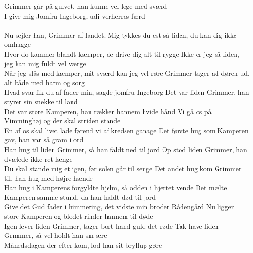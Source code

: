 \clearpage
{}

 Grimmer går på gulvet, han kunne vel lege med sværd\\
I give mig Jomfru Ingeborg, udi vorherres færd\\
\hops
{} {}\\
 Nu sejler han, Grimmer af landet.
\hops
{}Mig tykkes du est så liden, du kan dig ikke omhugge\\
Hvor do kommer blandt kæmper, de drive dig alt til rygge
\hops
{}Ikke er jeg så liden, jeg kan mig fuldt vel værge\\
Når jeg slås med kæmper, mit sværd kan jeg vel røre 
\hops
{}Grimmer tager ad døren ud, alt både med harm og sorg\\
Hvad svar fik du af fader min, sagde jomfru Ingeborg
\hops
{}Det var liden Grimmer, han styrer sin snekke til land\\
Det var store Kamperen, han rækker hannem hvide hånd
\hops
{}Vi gå os på Vimminghøj og der skal striden stande\\
En af os skal livet lade førend vi af kredsen ganage
\hops
{}Det første hug som Kamperen gav, han var så gram i ord\\
Han hug til liden Grimmer, så han faldt ned til jord
\hops
{}Op stod liden Grimmer, han dvælede ikke ret længe\\
Du skal stande mig et igen, før solen går til senge
\hops
{}Det andet hug kom Grimmer til, han hug med højre hænde\\
Han hug i Kamperens forgyldte hjelm, så odden i hjertet vende
\hops
{}Det mælte Kamperen samme stund, da han haldt død til jord\\
Give det Gud fader i himmering, det vidste min broder Rådengård
\hops
{}Nu ligger store Kamperen og blodet rinder hannem til døde\\
Igen lever liden Grimmer, tager bort hand guld det røde
\hops
{}Tak have liden Grimmer, så vel holdt han sin ære\\
Månedsdagen der efter kom, lod han sit bryllup gøre


\clearpage
{}

